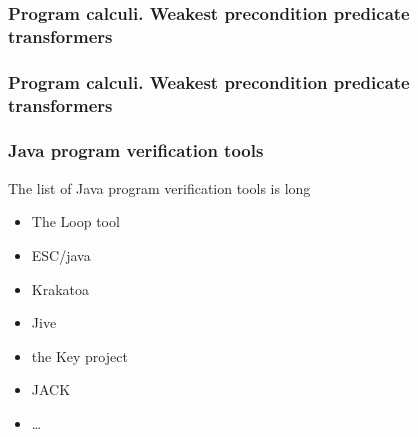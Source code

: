 \documentclass{beamer}
\begin{document}
 \begin{frame}\frametitle{Program calculi. Weakest precondition  predicate transformers}

 \end{frame}

 \begin{frame}\frametitle{Program calculi. Weakest precondition  predicate transformers}
  
 \end{frame}


\begin{frame}\frametitle{Java program verification tools}

The list of Java program verification tools is long 
\begin{itemize}
   \item  The Loop tool
     \item ESC/java
       \item Krakatoa
	 \item Jive
	   \item the Key project
	     \item JACK 
	       \item \ldots
\end{itemize}
\end{frame}
\end{document}

